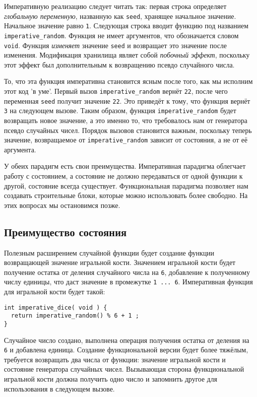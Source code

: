Императивную реализацию следует читать так: первая строка определяет \emph{глобальную переменную}, названную как \lstinline|seed|, хранящее начальное значение. Начальное значение равно \lstinline|1|. Следующая строка вводит функцию под названием \lstinline|imperative_random|. Функция не имеет аргументов, что обозначается словом \lstinline|void|. Функция \emph{изменяет} значение \lstinline|seed| и возвращает это значение после изменения. Модификация хранилища являет собой \emph{побочный эффект}, поскольку этот эффект был дополнительным к возвращению псевдо случайного числа.

То, что эта функция императивна становится ясным после того, как мы исполним этот код 'в уме'. Первый вызов \lstinline|imperative_random| вернёт \lstinline|22|, после чего переменная \lstinline|seed| получит значение \lstinline|22|. Это приведёт к тому, что функция вернёт \lstinline|3| на следующем вызове. Таким образом, функция \lstinline|imperative_random| будет возвращать новое значение, а это именно то, что требовалось нам от генератора псевдо случайных чисел. Порядок вызовов становится важным, поскольку теперь значение, возвращаемое от \lstinline|imperative_random| зависит от состояния, а не от её аргумента.

У обеих парадигм есть свои преимущества. Императивная парадигма облегчает работу с состоянием, а состояние не должно передаваться от одной функции к другой, состояние всегда существует. Функциональная парадигма позволяет нам создавать строительные блоки, которые можно использовать более свободно. На этих вопросах мы остановимся позже.

\subsection{Преимущество состояния}

Полезным расширением случайной функции будет создание функции возвращающей значение игральной кости. Значением игральной кости будет получение остатка от деления случайного числа на \lstinline|6|, добавление к полученному числу единицы, что даст значение в промежутке \lstinline|1 ... 6|. Императивная функция для игральной кости будет такой:

\begin{lstlisting}
int imperative_dice( void ) {
  return imperative_random() % 6 + 1 ;
}
\end{lstlisting}

Случайное число создано, выполнена операция получения остатка от деления на \lstinline|6| и добавлена единица. Создание функциональной версии будет более тяжёлым, требуется возвращать два числа от функции: значение игральной кости и состояние генератора случайных чисел. Вызывающая сторона функциональной игральной кости должна получить одно число и запомнить другое для использования в следующем вызове.

